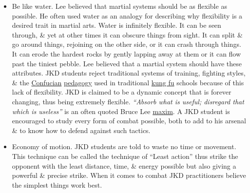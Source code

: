 \documentclass{article}
\begin{document}
\begin{itemize}
	\item {\sf Be like water.} {\sc Lee} believed that martial systems should be as flexible as possible. He often used water as an analogy for describing why flexibility is a desired trait in martial arts. Water is infinitely flexible. It can be seen through, \& yet at other times it can obscure things from sight. It can split \& go around things, rejoining on the other side, or it can crash through things. It can erode the hardest rocks by gently lapping away at them or it can flow past the tiniest pebble. {\sc Lee} believed that a martial system should have these attributes. JKD students reject traditional systems of training, fighting styles, \& the \href{https://en.wikipedia.org/wiki/Confucian}{Confucian} \href{https://en.wikipedia.org/wiki/Pedagogy}{pedagogy} used in traditional \href{https://en.wikipedia.org/wiki/Kung_fu}{kung fu} schools because of this lack of flexibility. JKD is claimed to be a dynamic concept that is forever changing, thus being extremely flexible. {\it``Absorb what is useful; disregard that which is useless''} is an often quoted {\sc Bruce Lee} \href{https://en.wikipedia.org/wiki/Maxim_(saying)}{maxim}. A JKD student is encouraged to study every form of combat possible, both to add to his arsenal \& to know how to defend against such tactics.
	
	\item {\sf Economy of motion.} JKD students are told to waste no time or movement. This technique can be called the technique of ``Least action'' thus strike the opponent with the least distance, time, \& energy possible but also giving a powerful \& precise strike. When it comes to combat JKD practitioners believe the simplest things work best.
	

\end{itemize}
\end{document}
